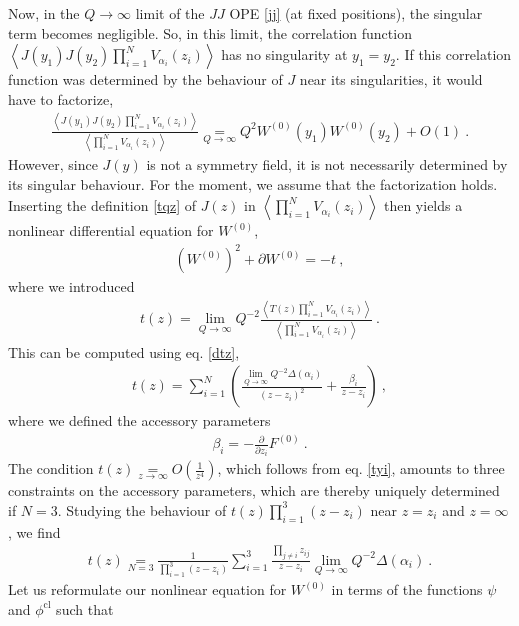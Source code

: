 \documentclass[12pt, a4paper, notitlepage, twoside]{report}
\numberwithin{equation}{section}
\theoremstyle{break}
\begin{document}
Now, in the $Q\to \infty$ limit of the $JJ$ OPE \eqref{jj} (at fixed positions), the singular term becomes negligible. So, in this limit, the correlation function $ \left\langle J(y_1)J(y_2)\prod_{i=1}^N V_{\alpha_i}(z_i) \right\rangle$ has no singularity at $y_1=y_2$. If this correlation function was determined by the behaviour of $J$ near its singularities, it would have to factorize,
\begin{align}
 \frac{\left\langle J(y_1)J(y_2)\prod_{i=1}^N V_{\alpha_i}(z_i)\right\rangle}{\left\langle \prod_{i=1}^N V_{\alpha_i}(z_i) \right\rangle} \underset{Q\to \infty}{=} Q^2W^{(0)}(y_1)W^{(0)}(y_2) + O(1)\ .
 \label{lqfac}
\end{align}
However, since $J(y)$ is not a symmetry field, it is not necessarily determined by its singular behaviour. For the moment, we assume that the factorization holds.
Inserting the definition \eqref{tqz} of $J(z)$ in $\left\langle \prod_{i=1}^N V_{\alpha_i}(z_i) \right\rangle$ then yields a nonlinear differential equation for $W^{(0)}$,
\begin{align}
 \boxed{\left(W^{(0)}\right)^2 + \partial W^{(0)} = - t}\ ,
\label{wwwt}
\end{align}
where we introduced
\begin{align}
 t(z) = \underset{Q\to \infty}{\lim} Q^{-2} \frac{\left\langle T(z) \prod_{i=1}^N V_{\alpha_i}(z_i) \right\rangle}{\left\langle \prod_{i=1}^N V_{\alpha_i}(z_i) \right\rangle}\ .
\end{align}
This can be computed using eq. \eqref{dtz}, 
\begin{align}
 t(z) = \sum_{i=1}^N \left( \frac{\underset{Q\to\infty}{\lim} Q^{-2}\Delta(\alpha_i)}{(z-z_i)^2} + \frac{\beta_i}{z-z_i} \right)\ ,
\label{tzs}
\end{align}
where we defined the accessory parameters
\begin{align}
 \beta_i = -{\frac{\partial}{\partial z_i}} F^{(0)}\ .
\end{align}
The condition $t(z) \underset{z\to \infty}{=} O(\frac{1}{z^4})$, which follows from eq. \eqref{tyi}, amounts to three constraints on the accessory parameters, which are thereby uniquely determined if $N= 3$. Studying the behaviour of $t(z)\prod_{i=1}^3(z-z_i)$ near $z=z_i$ and $z=\infty$, we find 
\begin{align}
 t(z) \underset{N=3}{=} \frac{1}{\prod_{i=1}^3(z-z_i)} \sum_{i=1}^3 \frac{\prod_{j\neq i} z_{ij}}{z-z_i}\underset{Q\to\infty}{\lim} Q^{-2}\Delta(\alpha_i)\ .
\end{align}
Let us reformulate our nonlinear equation for $W^{(0)}$ in terms of the functions $\psi$ and $\phi^\text{cl}$ such that
\end{document}
